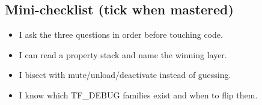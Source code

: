 \subsection*{Mini-checklist (tick when mastered)}
\begin{itemize}[leftmargin=*]
  \item[$\square$] I ask the three questions in order before touching code.
  \item[$\square$] I can read a property stack and name the winning layer.
  \item[$\square$] I bisect with mute/unload/deactivate instead of guessing.
  \item[$\square$] I know which TF\_DEBUG families exist and when to flip them.
\end{itemize}
